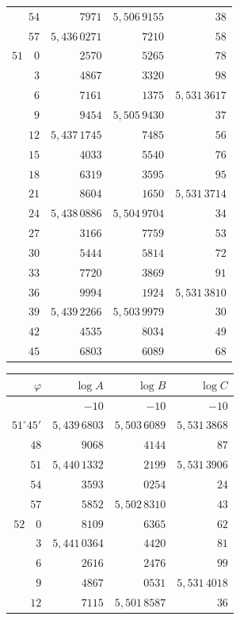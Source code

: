\begin{center}
\begin{tabular}[t]{|r|r|r|r|}
\(54\)&\(7971\)&\(5{,}506\,9155\)&\(38\)\\
\(57\)&\(5{,}436\,0271\)&\(7210\)&\(58\)\\
\(51\quad0\)&\(2570\)&\(5265\)&\(78\)\\
\hline
\(3\)&\(4867\)&\(3320\)&\(98\)\\
\(6\)&\(7161\)&\(1375\)&\(5{,}531\,3617\)\\
\(9\)&\(9454\)&\(5{,}505\,9430\)&\(37\)\\
\(12\)&\(5{,}437\,1745\)&\(7485\)&\(56\)\\
\(15\)&\(4033\)&\(5540\)&\(76\)\\
\hline
\(18\)&\(6319\)&\(3595\)&\(95\)\\
\(21\)&\(8604\)&\(1650\)&\(5{,}531\,3714\)\\
\(24\)&\(5{,}438\,0886\)&\(5{,}504\,9704\)&\(34\)\\
\(27\)&\(3166\)&\(7759\)&\(53\)\\
\(30\)&\(5444\)&\(5814\)&\(72\)\\
\hline
\(33\)&\(7720\)&\(3869\)&\(91\)\\
\(36\)&\(9994\)&\(1924\)&\(5{,}531\,3810\)\\
\(39\)&\(5{,}439\,2266\)&\(5{,}503\,9979\)&\(30\)\\
\(42\)&\(4535\)&\(8034\)&\(49\)\\
\(45\)&\(6803\)&\(6089\)&\(68\)\\
\hline\end{tabular}
\hfill
\begin{tabular}[t]{|r|r|r|r|}\hline
\(\varphi\)&\(\log A\)&\(\log B\)&\(\log C\)\\\hline\hline
&\(-10\)&\(-10\)&\(-10\)\\
\(51^\circ45'\)&\(5{,}439\,6803\)&\(5{,}503\,6089\)&\(5{,}531\,3868\)\\
\(48\)&\(9068\)&\(4144\)&\(87\)\\
\(51\)&\(5{,}440\,1332\)&\(2199\)&\(5{,}531\,3906\)\\
\(54\)&\(3593\)&\(0254\)&\(24\)\\
\(57\)&\(5852\)&\(5{,}502\,8310\)&\(43\)\\
\(52\quad0\)&\(8109\)&\(6365\)&\(62\)\\
\hline
\(3\)&\(5{,}441\,0364\)&\(4420\)&\(81\)\\
\(6\)&\(2616\)&\(2476\)&\(99\)\\
\(9\)&\(4867\)&\(0531\)&\(5{,}531\,4018\)\\
\(12\)&\(7115\)&\(5{,}501\,8587\)&\(36\)\\

\end{tabular}
\end{center}
